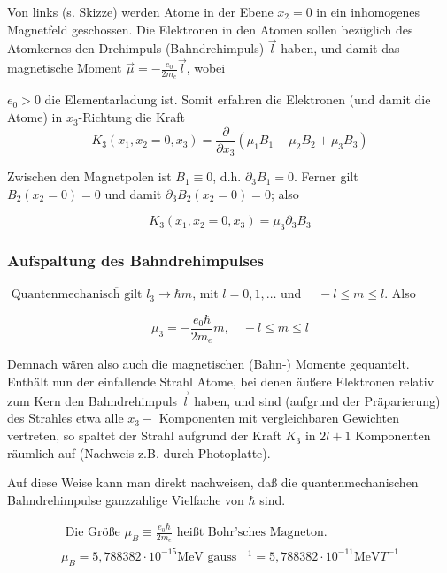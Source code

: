 \documentclass[10pt, letterpaper]{article}
\begin{document}
Von links (s. Skizze) werden Atome in der Ebene $x_{2}=0$ in ein inhomogenes Magnetfeld geschossen. Die Elektronen in den Atomen sollen bezüglich des Atomkernes den Drehimpuls (Bahndrehimpuls) $\vec{l}$ haben, und damit das magnetische Moment $\vec{\mu}=-\frac{e_{0}}{2 m_{e}} \vec{l}$, wobei

$e_{0}>0$ die Elementarladung ist. Somit erfahren die Elektronen (und damit die Atome) in $x_{3}$-Richtung die Kraft
$$
K_{3}\left(x_{1}, x_{2}=0, x_{3}\right)=\frac{\partial}{\partial x_{3}}\left(\mu_{1} B_{1}+\mu_{2} B_{2}+\mu_{3} B_{3}\right)
$$

Zwischen den Magnetpolen ist $B_{1} \equiv 0$, d.h. $\partial_{3} B_{1}=0$. Ferner gilt $B_{2}\left(x_{2}=0\right)=0$ und damit $\partial_{3} B_{2}\left(x_{2}=0\right)=0$; also

$$
K_{3}\left(x_{1}, x_{2}=0, x_{3}\right)=\mu_{3} \partial_{3} B_{3}
$$

\subsubsection*{Aufspaltung des Bahndrehimpulses}
$\overline{\text { Quantenmechanisch gilt } l_{3} \rightarrow \hbar m \text {, mit } l}=0,1, \ldots$ und $\quad-l \leq m \leq l$. Also

$$
\mu_{3}=-\frac{e_{0} \hbar}{2 m_{e}} m, \quad-l \leq m \leq l
$$

Demnach wären also auch die magnetischen (Bahn-) Momente gequantelt. Enthält nun der einfallende Strahl Atome, bei denen äußere Elektronen relativ zum Kern den Bahndrehimpuls $\vec{l}$ haben, und sind (aufgrund der Präparierung) des Strahles etwa alle $x_{3}-$ Komponenten mit vergleichbaren Gewichten vertreten, so spaltet der Strahl aufgrund der Kraft $K_{3}$ in $2 l+1$ Komponenten räumlich auf (Nachweis z.B. durch Photoplatte).

Auf diese Weise kann man direkt nachweisen, daß die quantenmechanischen Bahndrehimpulse ganzzahlige Vielfache von $\hbar$ sind.

$$
\begin{array}{c|}
\hline \text { Die Größe } \mu_{B} \equiv \frac{e_{0} \hbar}{2 m_{e}} \text { heißt Bohr'sches Magneton. } \\
\mu_{B}=5,788382 \cdot 10^{-15} \mathrm{MeV} \text { gauss }^{-1}=5,788382 \cdot 10^{-11} \mathrm{MeV} T^{-1}
\end{array}
$$
\end{document}
